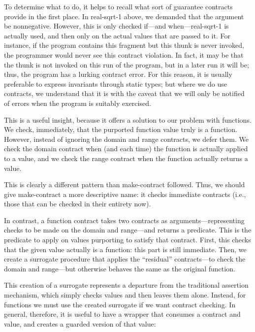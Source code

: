 
To determine what to do, it helps to recall what sort of guarantee contracts
provide in the first place. In real-sqrt-1 above, we demanded that the argument
be nonnegative. However, this is only checked if—and when—real-sqrt-1 is
actually used, and then only on the actual values that are passed to it. For
instance, if the program contains this fragment
but this thunk is never invoked, the programmer would never see this contract
violation. In fact, it may be that the thunk is not invoked on this run of the
program, but in a later run it will be; thus, the program has a lurking contract
error. For this reason, it is usually preferable to express invariants through
static types; but where we do use contracts, we understand that it is with the
caveat that we will only be notified of errors when the program is suitably
exercised.

This is a useful insight, because it offers a solution to our problem with
functions. We check, immediately, that the purported function value truly is a
function. However, instead of ignoring the domain and range contracts, we defer
them. We check the domain contract when (and each time) the function is actually
applied to a value, and we check the range contract when the function actually
returns a value.

This is clearly a different pattern than make-contract followed. Thus, we should
give make-contract a more descriptive name: it checks immediate contracts (i.e.,
those that can be checked in their entirety now).

In contrast, a function contract takes two contracts as arguments—representing
checks to be made on the domain and range—and returns a predicate. This is the
predicate to apply on values purporting to satisfy that contract. First, this
checks that the given value actually is a function: this part is still
immediate. Then, we create a surrogate procedure that applies the “residual”
contracts—to check the domain and range—but otherwise behaves the same as the
original function.

This creation of a surrogate represents a departure from the traditional
assertion mechanism, which simply checks values and then leaves them alone.
Instead, for functions we must use the created surrogate if we want contract
checking. In general, therefore, it is useful to have a wrapper that consumes a
contract and value, and creates a guarded version of that value:

